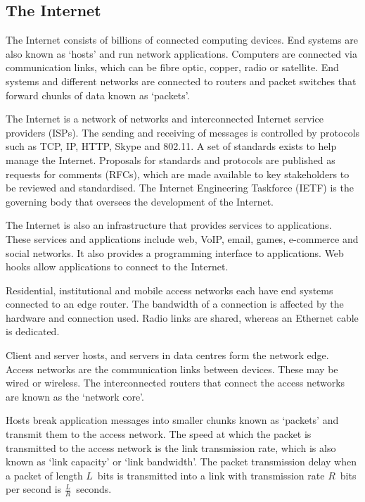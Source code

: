 \subsection{The Internet}

The Internet consists of billions of connected computing devices.
End systems are also known as `hosts' and run network applications.
Computers are connected via communication links, which can be fibre optic, copper, radio or satellite.
End systems and different networks are connected to routers and packet switches that forward chunks of data known as `packets'.

The Internet is a network of networks and interconnected Internet service providers (ISPs).
The sending and receiving of messages is controlled by protocols such as TCP, IP, HTTP, Skype and 802.11.
A set of standards exists to help manage the Internet.
Proposals for standards and protocols are published as requests for comments (RFCs), which are made available to key stakeholders to be reviewed and standardised.
The Internet Engineering Taskforce (IETF) is the governing body that oversees the development of the Internet.

The Internet is also an infrastructure that provides services to applications.
These services and applications include web, VoIP, email, games, e-commerce and social networks.
It also provides a programming interface to applications.
Web hooks allow applications to connect to the Internet.

Residential, institutional and mobile access networks each have end systems connected to an edge router.
The bandwidth of a connection is affected by the hardware and connection used.
Radio links are shared, whereas an Ethernet cable is dedicated.

Client and server hosts, and servers in data centres form the network edge.
Access networks are the communication links between devices.
These may be wired or wireless.
The interconnected routers that connect the access networks are known as the `network core'.

Hosts break application messages into smaller chunks known as `packets' and transmit them to the access network.
The speed at which the packet is transmitted to the access network is the link transmission rate, which is also known as `link capacity' or `link bandwidth'.
The packet transmission delay when a packet of length \( L \)~bits is transmitted into a link with transmission rate \( R \)~bits per second is \( \frac{L}{R} \)~seconds.

